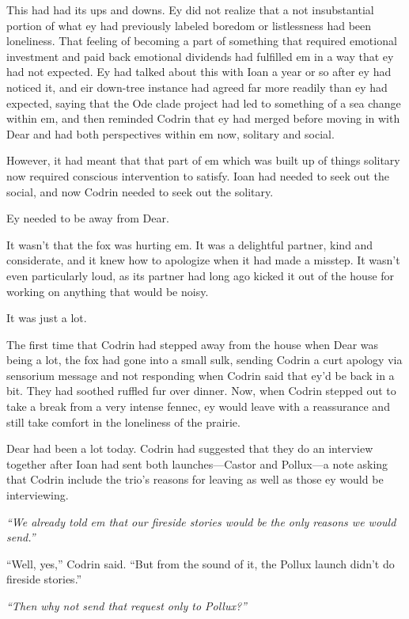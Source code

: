This had had its ups and downs. Ey did not realize that a not insubstantial portion of what ey had previously labeled boredom or listlessness had been loneliness. That feeling of becoming a part of something that required emotional investment and paid back emotional dividends had fulfilled em in a way that ey had not expected. Ey had talked about this with Ioan a year or so after ey had noticed it, and eir down-tree instance had agreed far more readily than ey had expected, saying that the Ode clade project had led to something of a sea change within em, and then reminded Codrin that ey had merged before moving in with Dear and had both perspectives within em now, solitary and social.

However, it had meant that that part of em which was built up of things solitary now required conscious intervention to satisfy. Ioan had needed to seek out the social, and now Codrin needed to seek out the solitary.

Ey needed to be away from Dear.

It wasn't that the fox was hurting em. It was a delightful partner, kind and considerate, and it knew how to apologize when it had made a misstep. It wasn't even particularly loud, as its partner had long ago kicked it out of the house for working on anything that would be noisy.

It was just a lot.

The first time that Codrin had stepped away from the house when Dear was being a lot, the fox had gone into a small sulk, sending Codrin a curt apology via sensorium message and not responding when Codrin said that ey'd be back in a bit. They had soothed ruffled fur over dinner. Now, when Codrin stepped out to take a break from a very intense fennec, ey would leave with a reassurance and still take comfort in the loneliness of the prairie.

Dear had been a lot today. Codrin had suggested that they do an interview together after Ioan had sent both launches---Castor and Pollux---a note asking that Codrin include the trio's reasons for leaving as well as those ey would be interviewing.

\emph{``We already told em that our fireside stories would be the only reasons we would send.''}

``Well, yes,'' Codrin said. ``But from the sound of it, the Pollux launch didn't do fireside stories.''

\emph{``Then why not send that request only to Pollux?''}

